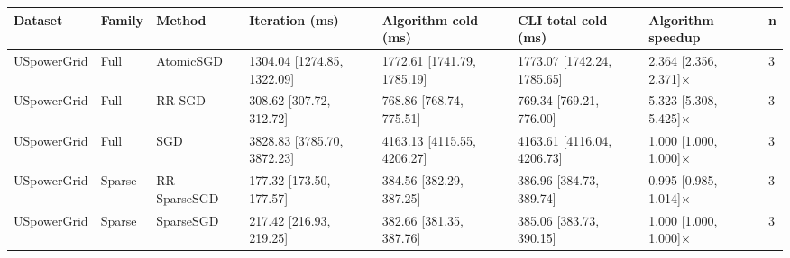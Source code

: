 \begin{tabular}{llllllll}
\hline
Dataset & Family & Method & Iteration (ms) & Algorithm cold (ms) & CLI total cold (ms) & Algorithm speedup & n \\
\hline
USpowerGrid & Full & AtomicSGD & 1304.04 [1274.85, 1322.09] & 1772.61 [1741.79, 1785.19] & 1773.07 [1742.24, 1785.65] & 2.364 [2.356, 2.371]× & 3 \\
USpowerGrid & Full & RR-SGD & 308.62 [307.72, 312.72] & 768.86 [768.74, 775.51] & 769.34 [769.21, 776.00] & 5.323 [5.308, 5.425]× & 3 \\
USpowerGrid & Full & SGD & 3828.83 [3785.70, 3872.23] & 4163.13 [4115.55, 4206.27] & 4163.61 [4116.04, 4206.73] & 1.000 [1.000, 1.000]× & 3 \\
USpowerGrid & Sparse & RR-SparseSGD & 177.32 [173.50, 177.57] & 384.56 [382.29, 387.25] & 386.96 [384.73, 389.74] & 0.995 [0.985, 1.014]× & 3 \\
USpowerGrid & Sparse & SparseSGD & 217.42 [216.93, 219.25] & 382.66 [381.35, 387.76] & 385.06 [383.73, 390.15] & 1.000 [1.000, 1.000]× & 3 \\
\hline
\end{tabular}
